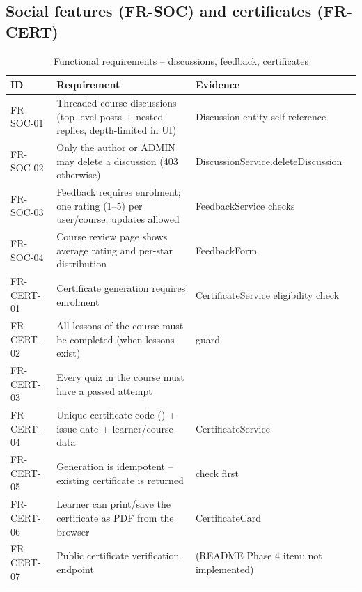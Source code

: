 \subsection{Social features (FR-SOC) and certificates (FR-CERT)}
\begin{table}[H]
\centering
\caption{Functional requirements -- discussions, feedback, certificates}
\label{tab:fr-social}
\begin{tabular}{@{}C{1.5cm}L{8.6cm}L{3.9cm}@{}}
\toprule
\textbf{ID} & \textbf{Requirement} & \textbf{Evidence} \\
\midrule
FR-SOC-01 & Threaded course discussions (top-level posts + nested replies, depth-limited in UI) & Discussion entity self-reference \\
FR-SOC-02 & Only the author or ADMIN may delete a discussion (403 otherwise) & DiscussionService.deleteDiscussion \\
FR-SOC-03 & Feedback requires enrolment; one rating (1--5) per user/course; updates allowed & FeedbackService checks \\
FR-SOC-04 & Course review page shows average rating and per-star distribution & FeedbackForm \\
FR-CERT-01 & Certificate generation requires enrolment & CertificateService eligibility check \\
FR-CERT-02 & All lessons of the course must be completed (when lessons exist) &  guard \\
FR-CERT-03 & Every quiz in the course must have a passed attempt &  \\
FR-CERT-04 & Unique certificate code () + issue date + learner/course data & CertificateService \\
FR-CERT-05 & Generation is idempotent -- existing certificate is returned &  check first \\
FR-CERT-06 & Learner can print/save the certificate as PDF from the browser & CertificateCard  \\
FR-CERT-07 & Public certificate verification endpoint &  (README Phase 4 item; not implemented) \\
\bottomrule
\end{tabular}
\end{table}

